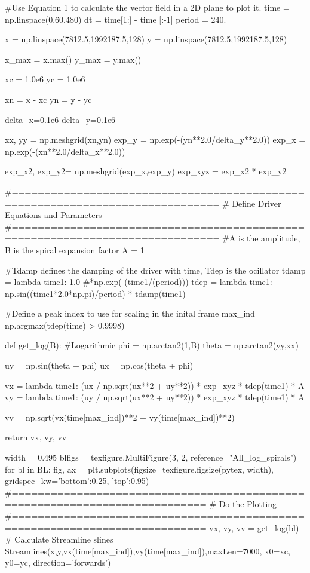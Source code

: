 \begin{pycode}[chapter5]
#Use Equation 1 to calculate the vector field in a 2D plane to plot it.
time = np.linspace(0,60,480)
dt = time[1:] - time [:-1]
period = 240.

x = np.linspace(7812.5,1992187.5,128)
y = np.linspace(7812.5,1992187.5,128)

x_max = x.max()
y_max = y.max()

xc = 1.0e6
yc = 1.0e6

xn = x - xc
yn = y - yc

delta_x=0.1e6
delta_y=0.1e6

xx, yy = np.meshgrid(xn,yn)
exp_y = np.exp(-(yn**2.0/delta_y**2.0))
exp_x = np.exp(-(xn**2.0/delta_x**2.0))

exp_x2, exp_y2= np.meshgrid(exp_x,exp_y)
exp_xyz = exp_x2 * exp_y2


#==============================================================================
# Define Driver Equations and Parameters
#==============================================================================
#A is the amplitude, B is the spiral expansion factor
A = 1

#Tdamp defines the damping of the driver with time, Tdep is the ocillator
tdamp = lambda time1: 1.0 #*np.exp(-(time1/(period)))
tdep = lambda time1: np.sin((time1*2.0*np.pi)/period) * tdamp(time1)

#Define a peak index to use for scaling in the inital frame
max_ind = np.argmax(tdep(time) > 0.9998)

def get_log(B):
    #Logarithmic
    phi = np.arctan2(1,B)
    theta = np.arctan2(yy,xx)

    uy = np.sin(theta + phi)
    ux =  np.cos(theta + phi)

    vx = lambda time1: (ux / np.sqrt(ux**2 + uy**2)) * exp_xyz * tdep(time1) * A
    vy = lambda time1: (uy / np.sqrt(ux**2 + uy**2)) * exp_xyz * tdep(time1) * A

    vv = np.sqrt(vx(time[max_ind])**2 + vy(time[max_ind])**2)

    return vx, vy, vv

width = 0.495
blfigs = texfigure.MultiFigure(3, 2, reference="All_log_spirals")
for bl in BL:
    fig, ax = plt.subplots(figsize=texfigure.figsize(pytex, width),
                           gridspec_kw={'bottom':0.25, 'top':0.95})
    #============================================================================
    # Do the Plotting
    #============================================================================
    vx, vy, vv = get_log(bl)
    # Calculate Streamline
    slines = Streamlines(x,y,vx(time[max_ind]),vy(time[max_ind]),maxLen=7000,
    x0=xc, y0=yc, direction='forwards')


\end{pycode}
